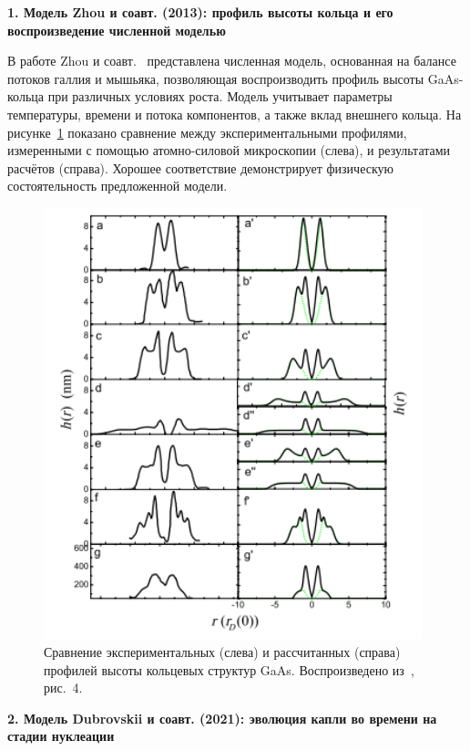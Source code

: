 \documentclass[14pt,oneside]{extarticle}
\begin{document}
\vspace{0.5em}
\noindent\textbf{1. Модель Zhou и соавт. (2013): профиль высоты кольца и его воспроизведение численной моделью}

В работе Zhou и соавт.~\cite{zhou2013} представлена численная модель, основанная на балансе потоков галлия и мышьяка, позволяющая воспроизводить профиль высоты GaAs-кольца при различных условиях роста. Модель учитывает параметры температуры, времени и потока компонентов, а также вклад внешнего кольца. На рисунке~\ref{fig:zhou_profiles} показано сравнение между экспериментальными профилями, измеренными с помощью атомно-силовой микроскопии (слева), и результатами расчётов (справа). Хорошее соответствие демонстрирует физическую состоятельность предложенной модели.

\begin{figure}
    \begin{center}
        \includegraphics[width=11cm]{images/zhou_profiles.png}
        \caption{\label{fig:zhou_profiles}
            Сравнение экспериментальных (слева) и рассчитанных (справа) профилей высоты кольцевых структур GaAs. Воспроизведено из~\cite{zhou2013}, рис.~4.}
    \end{center}
\end{figure}

\vspace{0.5em}
\noindent\textbf{2. Модель Dubrovskii и соавт. (2021): эволюция капли во времени на стадии нуклеации}
\end{document}
